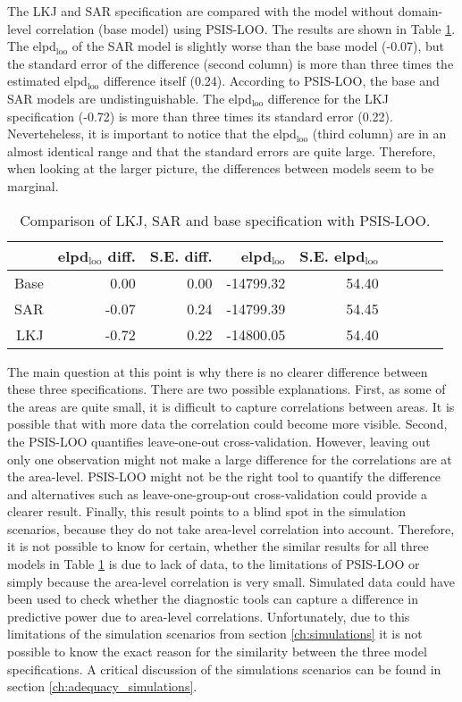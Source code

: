 The LKJ and SAR specification are compared with the model without domain-level correlation (base model) using PSIS-LOO.
The results are shown in Table \ref{tab:lkj_sar_base}.
The elpd$_{\text{loo}}$ of the SAR model is slightly worse than the base model (-0.07), but the standard error of the difference (second column) is more than three times the estimated elpd$_{\text{loo}}$ difference itself (0.24).
According to PSIS-LOO, the base and SAR models are undistinguishable.
The elpd$_{\text{loo}}$ difference for the LKJ specification (-0.72) is more than three times its standard error (0.22).
Neverteheless, it is important to notice that the elpd$_{\text{loo}}$ (third column) are in an almost identical range and that the standard errors are quite large.
Therefore, when looking at the larger picture, the differences between models seem to be marginal.

\begin{table}[ht]
    \centering
    \begin{tabular}{rrrrrrrrr}
        \hline
        & elpd$_{\text{loo}}$ diff. & S.E. diff. & elpd$_{\text{loo}}$ & S.E. elpd$_{\text{loo}}$  \\
        \hline
        Base & 0.00 & 0.00 & -14799.32 & 54.40  \\
        SAR & -0.07 & 0.24 & -14799.39 & 54.45  \\
        LKJ & -0.72 & 0.22 & -14800.05 & 54.40  \\
        \hline
    \end{tabular}
    \caption{Comparison of LKJ, SAR and base specification with PSIS-LOO.}
    \label{tab:lkj_sar_base}
\end{table}


The main question at this point is why there is no clearer difference between these three specifications.
There are two possible explanations.
First, as some of the areas are quite small, it is difficult to capture correlations between areas.
It is possible that with more data the correlation could become more visible.
Second, the PSIS-LOO quantifies leave-one-out cross-validation.
However, leaving out only one observation might not make a large difference for the correlations are at the area-level.
PSIS-LOO might not be the right tool to quantify the difference and alternatives such as leave-one-group-out cross-validation could provide a clearer result.
Finally, this result points to a blind spot in the simulation scenarios, because they do not take area-level correlation into account.
Therefore, it is not possible to know for certain, whether the similar results for all three models in Table \ref{tab:lkj_sar_base} is due to lack of data, to the limitations of PSIS-LOO or simply because the area-level correlation is very small.
Simulated data could have been used to check whether the diagnostic tools can capture a difference in predictive power due to area-level correlations.
Unfortunately, due to this limitations of the simulation scenarios from section \ref{ch:simulations} it is not possible to know the exact reason for the similarity between the three model specifications.
A critical discussion of the simulations scenarios can be found in section \ref{ch:adequacy_simulations}.

